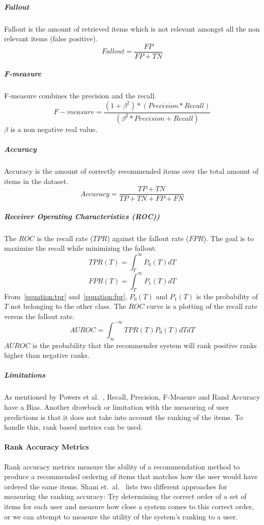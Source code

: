 \subparagraph{Fallout}
Fallout is the amount of retrieved items which is not relevant amongst all the non relevant items (false positive).
\begin{equation}
    Fallout = \frac{FP}{FP+TN}
    \label{equation:fallout}
\end{equation}

\subparagraph{F-measure}
F-measure combines the precision and the recall.
\begin{equation}
    F-measure = \frac{(1 + \beta^2) * (Precision * Recall)}{(\beta^2 * Precision + Recall)}
    \label{equation:f-measure}
\end{equation}
$\beta$ is a non negative real value.

\subparagraph{Accuracy}
Accuracy is the amount of correctly recommended items over the total amount of items in the dataset.
\begin{equation}
    Accuracy = \frac{TP+TN}{TP+TN+FP+FN}
    \label{equation:accuracy}
\end{equation}

\subparagraph{Receiver Operating Characteristics (ROC))}
The $ROC$ is the recall rate ($TPR$) against the fallout rate ($FPR$).
The goal is to maximize the recall while minimizing the fallout.
\begin{equation}
    TPR(T) = \int_T^\infty P_0(T)dT
    \label{equation:tpr}
\end{equation}
\begin{equation}
    FPR(T) = \int_T^\infty P_1(T)dT
    \label{equation:fpr}
\end{equation}
From~\ref{equation:tpr} and~\ref{equation:fpr}, $P_0(T)$ and $P_1(T)$ is the probability of $T$ not belonging to the other class.
The $ROC$ curve is a plotting of the recall rate versus the fallout rate.
\begin{equation}
    AUROC = \int_\infty^{-\infty} TPR(T)P_0(T)dTdT
    \label{equation:auroc}
\end{equation}
$AUROC$ is the probability that the recommender system will rank positive ranks higher than negative ranks.


\subparagraph{Limitations}
\label{subp:limitations}
As mentioned by Powers et al.~\cite{powers2007}, Recall, Precision, F-Measure and Rand Accuracy have a Bias.
Another drawback or limitation with the measuring of user predictions is that it does not take into account the ranking of the items.
To handle this, rank based metrics can be used.


\paragraph{Rank Accuracy Metrics}
Rank accuracy metrics measure the ability of a recommendation method to produce
a recommended ordering of items that matches how the user would have ordered
the same items. Shani et.\ al.~\cite{Shani2011} lists two different approaches
for measuring the ranking accuracy: Try determining the correct order of a set
of items for each user and measure how close a system comes to this correct
order, or we can attempt to measure the utility of the system's ranking to a
user.

